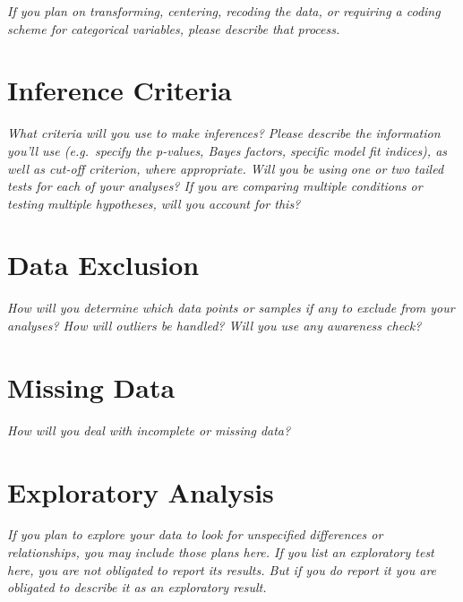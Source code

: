 \documentclass[12pt]{article}
\begin{document}
\textit{If you plan on transforming, centering, recoding the data, or requiring a coding scheme for categorical variables, please describe that process.}

\section{Inference Criteria}

\textit{What criteria will you use to make inferences? Please describe the information you'll use (e.g.\ specify the p-values, Bayes factors, specific model fit indices), as well as cut-off criterion, where appropriate. Will you be using one or two tailed tests for each of your analyses? If you are comparing multiple conditions or testing multiple hypotheses, will you account for this?}

\section{Data Exclusion}

\textit{How will you determine which data points or samples if any to exclude from your analyses? How will outliers be handled? Will you use any awareness check?}

\section{Missing Data}

\textit{How will you deal with incomplete or missing data?}

\section{Exploratory Analysis}

\textit{If you plan to explore your data to look for unspecified differences or relationships, you may include those plans here. If you list an exploratory test here, you are not obligated to report its results. But if you do report it you are obligated to describe it as an exploratory result.}
\end{document}
